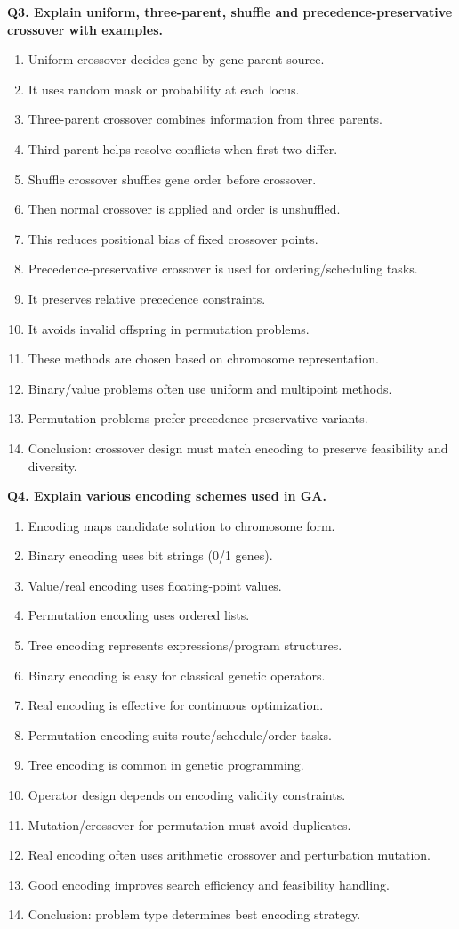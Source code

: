 \documentclass[11pt,a4paper]{article}
\begin{document}
\textbf{Q3. Explain uniform, three-parent, shuffle and precedence-preservative crossover with examples.}
\begin{enumerate}
\item Uniform crossover decides gene-by-gene parent source.
\item It uses random mask or probability at each locus.
\item Three-parent crossover combines information from three parents.
\item Third parent helps resolve conflicts when first two differ.
\item Shuffle crossover shuffles gene order before crossover.
\item Then normal crossover is applied and order is unshuffled.
\item This reduces positional bias of fixed crossover points.
\item Precedence-preservative crossover is used for ordering/scheduling tasks.
\item It preserves relative precedence constraints.
\item It avoids invalid offspring in permutation problems.
\item These methods are chosen based on chromosome representation.
\item Binary/value problems often use uniform and multipoint methods.
\item Permutation problems prefer precedence-preservative variants.
\item Conclusion: crossover design must match encoding to preserve feasibility and diversity.
\end{enumerate}

\textbf{Q4. Explain various encoding schemes used in GA.}
\begin{enumerate}
\item Encoding maps candidate solution to chromosome form.
\item Binary encoding uses bit strings (0/1 genes).
\item Value/real encoding uses floating-point values.
\item Permutation encoding uses ordered lists.
\item Tree encoding represents expressions/program structures.
\item Binary encoding is easy for classical genetic operators.
\item Real encoding is effective for continuous optimization.
\item Permutation encoding suits route/schedule/order tasks.
\item Tree encoding is common in genetic programming.
\item Operator design depends on encoding validity constraints.
\item Mutation/crossover for permutation must avoid duplicates.
\item Real encoding often uses arithmetic crossover and perturbation mutation.
\item Good encoding improves search efficiency and feasibility handling.
\item Conclusion: problem type determines best encoding strategy.
\end{enumerate}
\end{document}
